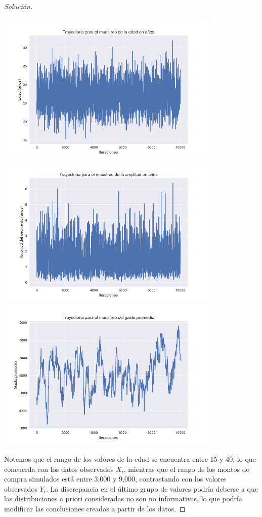 \documentclass{article}
\begin{document}
\begin{enumerate}
\begin{proof}[Solución]
        \begin{center}
            \includegraphics[width=0.8\textwidth]{Tarea9/traja.png}
            \includegraphics[width=0.8\textwidth]{Tarea9/trajb.png}
            \includegraphics[width=0.8\textwidth]{Tarea9/trajc.png}
        \end{center}

        Notemos que el rango de los valores de la edad se encuentra entre 15 y 40, 
        lo que concuerda con los datos observados $X_i$, mientras que el rango de
        los montos de compra simulados está entre 3,000 y 9,000, contrastando con los
        valores observados $Y_i$. La discrepancia en el último grupo de valores podría
        deberse a que las distribuciones a priori consideradas no son no informativas, 
        lo que podría modificar las conclusiones creadas a partir de los datos.


\end{proof}
\end{enumerate}
\end{document}

